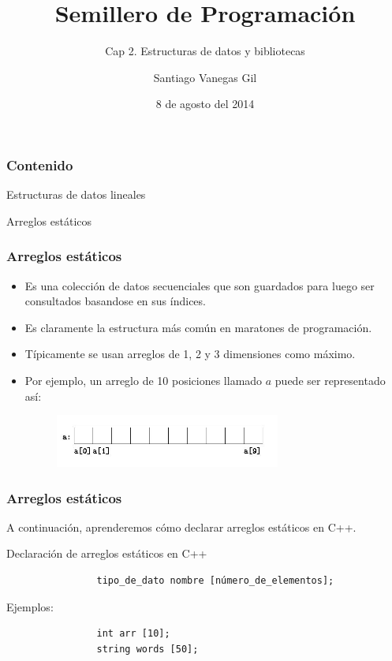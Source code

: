 \documentclass{beamer}
\title{Semillero de Programación}
\subtitle{Cap 2. Estructuras de datos y bibliotecas}
\author{Santiago Vanegas Gil}
\institute{Universidad EAFIT}
\date{8 de agosto del 2014}
\begin{document}
\begin{frame}
	\titlepage
\end{frame}

\begin{frame}
	\frametitle{Contenido}
	\tableofcontents
\end{frame}


\begin{section}{Estructuras de datos lineales}
\begin{subsection}{Arreglos estáticos}
	\begin{frame}[fragile]
		\frametitle{Arreglos estáticos}
		\begin{itemize}
			\item{Es una colección de datos secuenciales que son guardados para luego ser consultados basandose en sus índices.}
			\item{Es claramente la estructura más común en maratones de programación.}
			\item{Típicamente se usan arreglos de 1, 2 y 3 dimensiones como máximo.}
			\item{Por ejemplo, un arreglo de 10 posiciones llamado $a$ puede ser representado así:}
			\begin{figure}
				\includegraphics[width = 0.7\textwidth]{src/arreglo.jpg}
			\end{figure}			
		\end{itemize}
	\end{frame}
	
	\begin{frame}[fragile]
		\frametitle{Arreglos estáticos}
		A continuación, aprenderemos cómo declarar arreglos estáticos en C++.
		\begin{block}{Declaración de arreglos estáticos en C++}
			\begin{verbatim}
				tipo_de_dato nombre [número_de_elementos];
			\end{verbatim}
			Ejemplos:\\
			\begin{verbatim}
				int arr [10];
				string words [50];
			\end{verbatim}			
		\end{block}		
	\end{frame}
	

\end{subsection}
\end{section}
\end{document}
